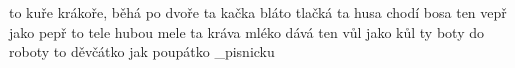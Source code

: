 
\chyph
\fontfam [LMfonts]
\parindent 0pt
   {to kuře krákoře, běhá po dvoře}
 {ta kačka bláto tlačká}
   {ta husa chodí bosa}
   {ten vepř jako pepř}
   {to tele hubou mele}
  {ta kráva mléko dává}
   {ten vůl jako kůl}
   {ty boty do roboty}
  {to děvčátko jak poupátko}
\vysazej_pisnicku
\endmulti
\bye
